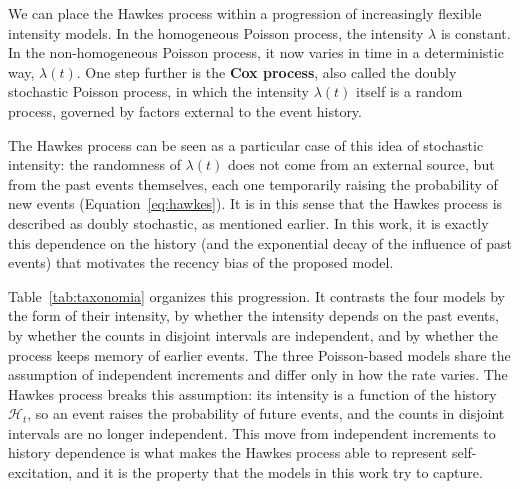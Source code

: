     We can place the Hawkes process within a progression of increasingly flexible intensity models. In the homogeneous Poisson process, the intensity $\lambda$ is constant. In the non-homogeneous Poisson process, it now varies in time in a deterministic way, $\lambda(t)$. One step further is the \textbf{Cox process}, also called the doubly stochastic Poisson process, in which the intensity $\lambda(t)$ itself is a random process, governed by factors external to the event history.

    The Hawkes process can be seen as a particular case of this idea of stochastic intensity: the randomness of $\lambda(t)$ does not come from an external source, but from the past events themselves, each one temporarily raising the probability of new events (Equation~\eqref{eq:hawkes}). It is in this sense that the Hawkes process is described as doubly stochastic, as mentioned earlier. In this work, it is exactly this dependence on the history (and the exponential decay of the influence of past events) that motivates the recency bias of the proposed model.

    Table~\ref{tab:taxonomia} organizes this progression. It contrasts the four models by the form of their intensity, by whether the intensity depends on the past events, by whether the counts in disjoint intervals are independent, and by whether the process keeps memory of earlier events. The three Poisson-based models share the assumption of independent increments and differ only in how the rate varies. The Hawkes process breaks this assumption: its intensity is a function of the history $\mathcal{H}_t$, so an event raises the probability of future events, and the counts in disjoint intervals are no longer independent. This move from independent increments to history dependence is what makes the Hawkes process able to represent self-excitation, and it is the property that the models in this work try to capture.

    \begin{table}[h!]
    \centering
    \caption{Taxonomy of point processes, from the Poisson process to the Hawkes process.}
    \label{tab:taxonomia}
    \end{table}

